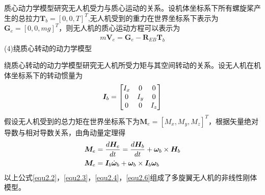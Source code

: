 质心动力学模型研究无人机受力与质心运动的关系。设机体坐标系下所有螺旋桨产生的总拉力$\boldsymbol{T}_b=[0,0,T]^{T}$,无人机受到的重力在世界坐标系下表示为$\boldsymbol{G}_e=[0,0,mg]^T$，则无人机的质心运动方程可以表示为
\begin{equation}
\label{equ2.4}
\begin{aligned}
m\boldsymbol{V}_e = \boldsymbol{G}_e -  \boldsymbol{R}_{EB} \boldsymbol{T}_b
\end{aligned}
\end{equation}
(4)绕质心转动的动力学模型

绕质心转动的动力学模型研究无人机所受力矩与其空间转动的关系。设无人机在机体坐标系下的转动惯量为
\begin{equation}
\label{equ2.5}
\boldsymbol{I}_b = 
\begin{bmatrix}
I_x & 0 & 0 \cr
0 & I_y & 0 \cr
0 & 0 & I_z \cr
\end{bmatrix}
\end{equation}
假设无人机受到的总力矩在世界坐标系下为$\boldsymbol{M}_e=[M_x,M_y,M_z]^T$，根据矢量绝对导数与相对导数关系，由角动量定理得
\begin{equation}
\label{equ2.6}
\begin{aligned}
\boldsymbol{M}_e &= {d\boldsymbol{H}_e \over dt} = {d\boldsymbol{H}_b \over dt} +  \boldsymbol{\omega}_b \times \boldsymbol{H}_b 
\\
\boldsymbol{M}_e &= \boldsymbol{I}_b \dot{\boldsymbol{\omega}}_b +\boldsymbol{\omega}_b \times \boldsymbol{I}_b \boldsymbol{\omega}_b 
\end{aligned}
\end{equation}
以上公式\eqref{equ2.2}，\eqref{equ2.3}，\eqref{equ2.4}，\eqref{equ2.6}组成了多旋翼无人机的非线性刚体模型。

